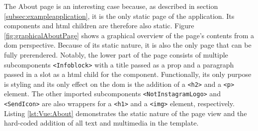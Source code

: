 \documentclass[a4paper, 10pt]{article}
\begin{document}
The About page is an interesting case because, as described in section \ref{subsec:exampleapplication}, it is the only static page of the application.
Its components and \acrshort{html} children are therefore also static.
Figure \ref{fig:graphicalAboutPage} shows a graphical overview of the page's contents from a \acrshort{dom} perspective.
Because of its static nature, it is also the only page that can be fully prerendered.
Notably, the lower part of the page consists of multiple subcomponents \verb|<Infoblock>| with a title passed as a prop and a paragraph passed in a slot as a \acrshort{html} child for the component.
Functionally, its only purpose is styling and its only effect on the \acrshort{dom} is the addition of a \verb|<h2>| and a \verb|<p>| element.
The other imported subcomponents \verb|<NotInstagramLogo>| and \verb|<SendIcon>| are also wrappers for a \verb|<h1>| and a \verb|<img>| element, respectively.
Listing \ref{lst:Vue:About} demonstrates the static nature of the page view and the hard-coded addition of all text and multimedia in the template.
\end{document}
